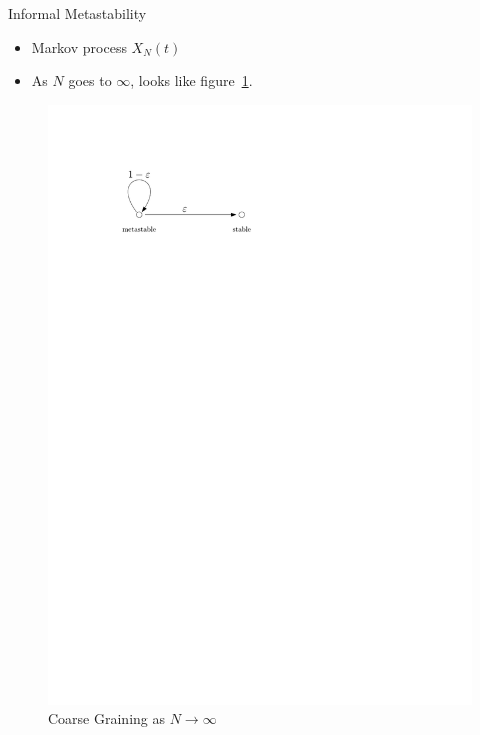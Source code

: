 \documentclass{beamer}
\begin{document}
\begin{frame}{Informal Metastability}
  \begin{itemize}
    \item Markov process $X_{N}(t)$
    \pause
    \item As $N$ goes to $\infty$, looks like figure~\ref{fig:coarse_grain}.
  \end{itemize}
  \begin{figure}
    \includegraphics[width=0.7\pagewidth]{metastable_coarse_grain.pdf}
    \caption{Coarse Graining as $N \to \infty$}
    \label{fig:coarse_grain}
  \end{figure}
\end{frame}
\end{document}
